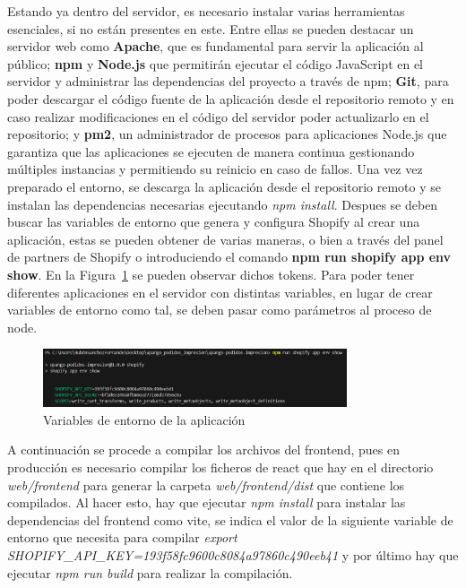 \documentclass[12pt]{article}
\begin{document}
Estando ya dentro del servidor, es necesario instalar varias herramientas esenciales, si no están presentes en este. Entre ellas se pueden destacar un servidor web como \textbf{Apache}, que es fundamental para servir la aplicación
al público; \textbf{npm} y \textbf{Node.js} que permitirán ejecutar el código JavaScript en el servidor y administrar las dependencias del proyecto a través de npm; \textbf{Git}, para poder descargar el código fuente de la aplicación desde 
el repositorio remoto y en caso realizar modificaciones en el código del servidor poder actualizarlo en el repositorio; y \textbf{pm2}, un administrador de 
procesos para aplicaciones Node.js que garantiza que las aplicaciones se ejecuten de manera continua gestionando múltiples instancias y permitiendo su reinicio en caso de fallos.
Una vez vez preparado el entorno, se descarga la aplicación desde el repositorio remoto y se instalan las dependencias necesarias ejecutando \textit{npm install}. Despues se deben buscar las variables de entorno que genera y configura Shopify al crear una aplicación,
estas se pueden obtener de varias maneras, o bien a través del panel de partners de Shopify o introduciendo el comando \textbf{npm run shopify app env show}. En la Figura~\ref{fig:VariablesEntorno} se pueden observar dichos tokens. Para poder 
tener diferentes aplicaciones en el servidor con distintas variables, en lugar de crear variables de entorno como tal, se deben pasar como parámetros al proceso de node.

\begin{figure}[ht]
    \centering
    \includegraphics[width=0.8\textwidth]{imagenes/variablesEntornoDespliegue.png}
    \caption{\label{fig:VariablesEntorno}Variables de entorno de la aplicación}
    \vspace{\fill}
\end{figure}

A continuación se procede a compilar los archivos del frontend, pues en producción es necesario compilar los ficheros de react que hay en el directorio \textit{web/frontend} 
para generar la carpeta \textit{web/frontend/dist} que contiene los compilados. Al hacer esto, hay que ejecutar \textit{npm install} para instalar las dependencias del frontend como vite,
se indica el valor de la siguiente variable de entorno que necesita para compilar \textit{export SHOPIFY\_API\_KEY=193f58fc9600c8084a97860c490eeb41} y por último hay que ejecutar \textit{npm run build} para realizar
la compilación.
\end{document}
